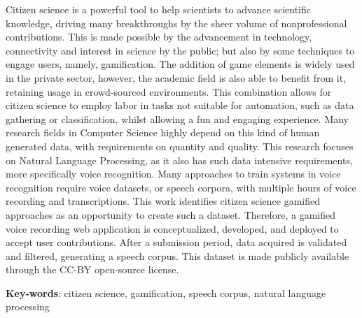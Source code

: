 
\setlength{\absparsep}{18pt}
\begin{resumo}
    Citizen science is a powerful tool to help scientists to advance scientific knowledge, driving many breakthroughs by the sheer volume of nonprofessional contributions. This is made possible by the advancement in technology, connectivity and interest in science by the public; but also by some techniques to engage users, namely, gamification. The addition of game elements is widely used in the private sector, however, the academic field is also able to benefit from it,
    retaining usage in crowd-sourced environments. This combination allows for citizen science to employ labor in tasks not suitable for automation, such as data gathering or classification, whilst allowing a fun and engaging experience. Many research fields in Computer Science highly depend on this kind of human generated data, with requirements on quantity and quality. This research focuses on Natural Language Processing, as it also has such data intensive requirements, more specifically voice recognition. Many approaches to train systems in voice recognition require voice datasets, or speech corpora, with multiple hours of voice recording and transcriptions. This work identifies citizen science gamified approaches as an opportunity to create such a dataset. Therefore, a gamified voice recording web application is conceptualized, developed, and deployed to accept user contributions. After a submission period, data acquired is validated and filtered, generating a speech corpus. This dataset is made publicly available through the CC-BY open-source license.
	\vspace{\onelineskip}
	\noindent 
	
	\textbf{Key-words}: citizen science, gamification, speech corpus, natural language processing
\end{resumo}
